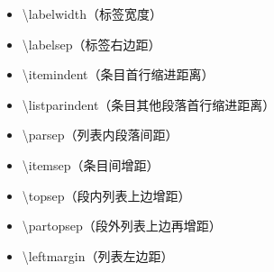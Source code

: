 ﻿\documentclass{article}
\begin{document}
    \begin{itemize}
        \item \textbackslash{}labelwidth（标签宽度）
        \item \textbackslash{}labelsep（标签右边距）
        \item \textbackslash{}itemindent（条目首行缩进距离）
        \item \textbackslash{}listparindent（条目其他段落首行缩进距离）
        \item \textbackslash{}parsep（列表内段落间距）
        \item \textbackslash{}itemsep（条目间增距）
        \item \textbackslash{}topsep（段内列表上边增距）
        \item \textbackslash{}partopsep（段外列表上边再增距）
        \item \textbackslash{}leftmargin（列表左边距）

\end{itemize}
\end{document}
